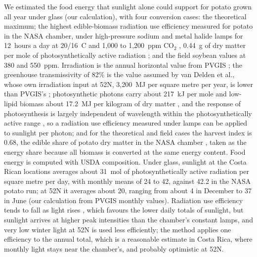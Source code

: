 We estimated the food energy that sunlight alone could support for potato grown all year under glass (our calculation), with four conversion cases: the theoretical maximum; the highest edible-biomass radiation use efficiency measured for potato in the NASA chamber, under high-pressure sodium and metal halide lamps for 12~hours a day at 20/16~\textdegree{}C and 1{,}000 to 1{,}200~ppm CO$_2$ \cite[pp.~707--708]{wheeler2008crop}, 0.44~g of dry matter per mole of photosynthetically active radiation \cite[Abstract, p.~706; Table~2, p.~711]{wheeler2008crop}; and the field soybean values at 380 and 550~ppm. Irradiation is the annual horizontal value from PVGIS \cite{jrc2026pvgis}; the greenhouse transmissivity of 82\% is the value assumed by van Delden et al., whose own irradiation input at 52\textdegree{}N, 3{,}200~MJ per square metre per year, is lower than PVGIS's \cite[Fig.~4b and caption, p.~952]{vandelden2021vf}; photosynthetic photons carry about 217~kJ per mole and low-lipid biomass about 17.2~MJ per kilogram of dry matter \cite[pp.~869, 872]{bugbee1988limits}, and the response of photosynthesis is largely independent of wavelength within the photosynthetically active range \cite[p.~243]{zhu2010photosynthesis}, so a radiation use efficiency measured under lamps can be applied to sunlight per photon;%
 and for the theoretical and field cases the harvest index is 0.68, the edible share of potato dry matter in the NASA chamber \cite[Table~2, p.~711]{wheeler2008crop}, taken as the energy share because all biomass is converted at the same energy content. Food energy is computed with USDA composition. Under glass, sunlight at the Costa Rican locations averages about 31~mol of photosynthetically active radiation per square metre per day, with monthly means of 24 to 42, against 42.2 in the NASA potato run; at 52\textdegree{}N it averages about 20, ranging from about 4 in December to 37 in June (our calculation from PVGIS monthly values). Radiation use efficiency tends to fall as light rises \cite[p.~711]{wheeler2008crop}\cite[Abstract, p.~869; Fig.~2, p.~873]{bugbee1988limits}, which favours the lower daily totals of sunlight, but sunlight arrives at higher peak intensities than the chamber's constant lamps, and very low winter light at 52\textdegree{}N is used less efficiently; the method applies one efficiency to the annual total, which is a reasonable estimate in Costa Rica, where monthly light stays near the chamber's, and probably optimistic at 52\textdegree{}N.


